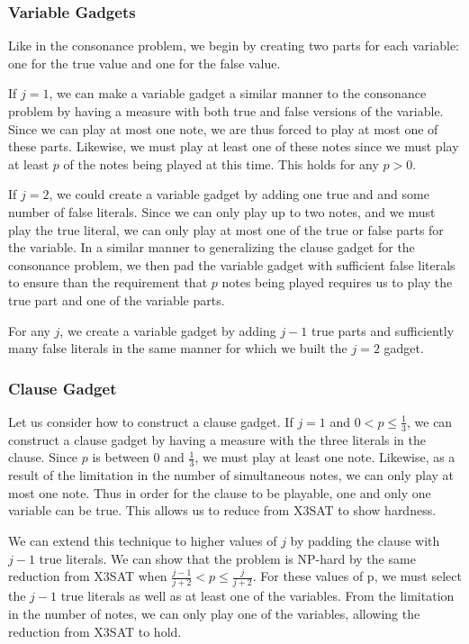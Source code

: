 \documentclass[11pt,letterpaper]{article}
\begin{document}
\subsubsection{Variable Gadgets}
Like in the consonance problem, we begin by creating two parts for each variable: one for the true value and one for the false value.

If $j=1$, we can make a variable gadget a similar manner to the consonance problem by having a measure with both true and false versions of the variable. Since we can play at most one note, we are thus forced to play at most one of these parts. Likewise, we must play at least one of these notes since we must play at least $p$ of the notes being played at this time. This holds for any $p>0$.

If $j=2$, we could create a variable gadget by adding one true and and some number of false literals. Since we can only play up to two notes, and we must play the true literal, we can only play at most one of the true or false parts for the variable. In a similar manner to generalizing the clause gadget for the consonance problem, we then pad the variable gadget with sufficient false literals to ensure than the requirement that $p$ notes being played requires us to play the true part and one of the variable parts.

For any $j$, we create a variable gadget by adding $j-1$ true parts and sufficiently many false literals in the same manner for which we built the $j=2$ gadget.

\subsubsection{Clause Gadget}
Let us consider how to construct a clause gadget. %
If $j=1$ and $0<p \le \frac13$, we can construct a clause gadget by having a measure with the three literals in the clause. Since $p$ is between $0$ and $\frac13$, we must play at least one note. Likewise, as a result of the limitation in the number of simultaneous notes, we can only play at most one note. Thus in order for the clause to be playable, one and only one variable can be true. This allows us to reduce from X3SAT to show hardness.

We can extend this technique to higher values of $j$ by padding the clause with $j-1$ true literals. We can show that the problem is NP-hard by the same reduction from X3SAT when $\frac{j-1}{j+2} < p \le \frac{j}{j+2}$. For these values of p, we must select the $j-1$ true literals as well as at least one of the variables. From the limitation in the number of notes, we can only play one of the variables, allowing the reduction from X3SAT to hold.
\end{document}
